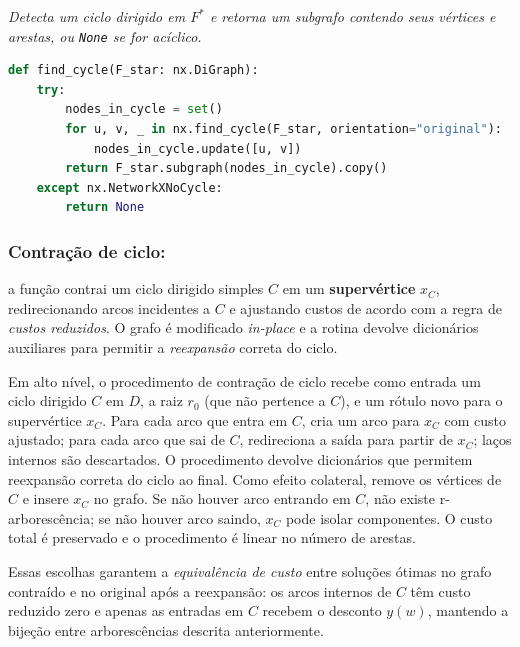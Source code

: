 \begin{tcolorbox}[
        enhanced, breakable,
        colframe=blue!60!black, colback=blue!2,
        colbacktitle=blue!15, coltitle=black,
        title={Detecção de ciclo dirigido em $F^*$},
        boxed title style={sharp corners, boxrule=0.6pt},
        sharp corners, boxrule=0.6pt
    ]
    \emph{Detecta um ciclo dirigido em $F^*$ e retorna um subgrafo contendo seus vértices e arestas, ou \texttt{None} se for acíclico.}
    \tcblower
    \begin{lstlisting}[mathescape=true, language=Python]
def find_cycle(F_star: nx.DiGraph):
    try:
        nodes_in_cycle = set()
        for u, v, _ in nx.find_cycle(F_star, orientation="original"):
            nodes_in_cycle.update([u, v])
        return F_star.subgraph(nodes_in_cycle).copy()
    except nx.NetworkXNoCycle:
        return None  
\end{lstlisting}
\end{tcolorbox}


\subsubsection{Contração de ciclo:}
a função contrai um ciclo dirigido simples \(C\) em um \textbf{supervértice} \(x_C\), redirecionando arcos incidentes a \(C\) e ajustando custos de acordo com a regra de \emph{custos reduzidos}. O grafo é modificado \emph{in-place} e a rotina devolve dicionários auxiliares para permitir a \emph{reexpansão} correta do ciclo.

Em alto nível, o procedimento de contração de ciclo recebe como entrada um ciclo dirigido $C$ em $D$, a raiz $r_0$ (que não pertence a $C$), e um rótulo novo para o supervértice $x_C$. Para cada arco que entra em $C$, cria um arco para $x_C$ com custo ajustado; para cada arco que sai de $C$, redireciona a saída para partir de $x_C$; laços internos são descartados. O procedimento devolve dicionários que permitem reexpansão correta do ciclo ao final. Como efeito colateral, remove os vértices de $C$ e insere $x_C$ no grafo. Se não houver arco entrando em $C$, não existe r-arborescência; se não houver arco saindo, $x_C$ pode isolar componentes. O custo total é preservado e o procedimento é linear no número de arestas.

Essas escolhas garantem a \emph{equivalência de custo} entre soluções ótimas no grafo contraído e no original após a reexpansão: os arcos internos de \(C\) têm custo reduzido zero e apenas as entradas em \(C\) recebem o desconto \(y(w)\), mantendo a bijeção entre arborescências descrita anteriormente.


